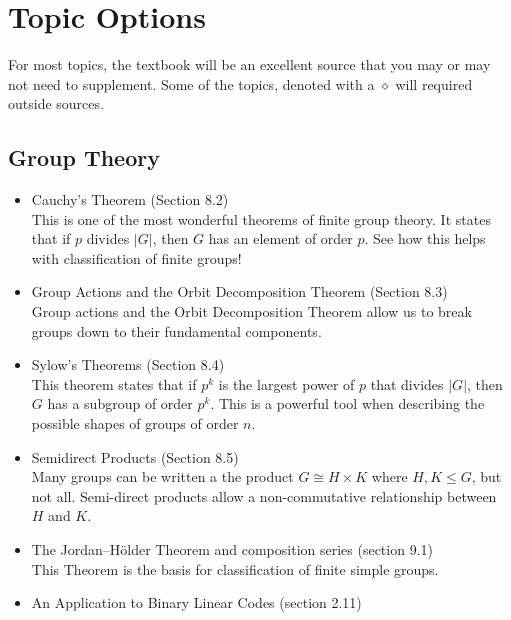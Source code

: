 \documentclass[12pt]{article}
\begin{document}
\newpage

	\section*{Topic Options}
	For most topics, the textbook will be an excellent source that you may or may not need to supplement.  Some of the topics, denoted with a $\diamond$ will required outside sources. 
	
	\begin{center}
	\end{center}
	\subsection*{Group Theory}
	\begin{itemize}
		\item Cauchy's Theorem (Section 8.2)\\
			
			This is one of the most wonderful theorems of finite group theory.  It states that if $p$ divides $|G|$, then $G$ has an element of order $p$. See how this helps with classification of finite groups!
		\item Group Actions and the Orbit Decomposition Theorem (Section 8.3)\\
		
			Group actions and the Orbit Decomposition Theorem allow us to break groups down to their fundamental components.
		\item Sylow's Theorems (Section 8.4)\\
		
			This theorem states that if $p^k$ is the largest power of $p$ that divides $|G|$, then $G$ has a subgroup of order $p^k$.  This is a powerful tool when describing the possible shapes of groups of order $n$.
		\item Semidirect Products (Section 8.5)\\
		
			Many groups can be written a the product $G\cong H\times K$ where $H,K\leq G$, but not all.  Semi-direct products allow a non-commutative relationship between $H$ and $K$.
		\item The Jordan--H\"older Theorem and composition series (section 9.1)\\
		
			This Theorem is the basis for classification of finite simple groups.
%		
%			
		\item An Application to Binary Linear Codes (section 2.11)
			

\end{itemize}
\end{document}
